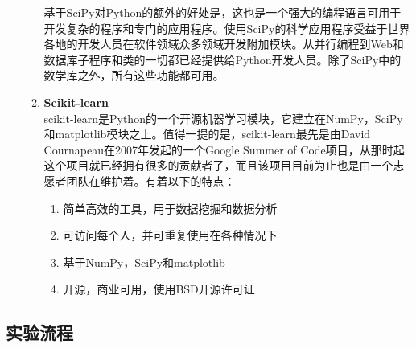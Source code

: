 \begin{enumerate}
\begin{enumerate}
        基于SciPy对Python的额外的好处是，这也是一个强大的编程语言可用于开发复杂的程序和专门的应用程序。使用SciPy的科学应用程序受益于世界各地的开发人员在软件领域众多领域开发附加模块。从并行编程到Web和数据库子程序和类的一切都已经提供给Python开发人员。除了SciPy中的数学库之外，所有这些功能都可用。
        \item \textbf{Scikit-learn} \\ scikit-learn是Python的一个开源机器学习模块，它建立在NumPy，SciPy和matplotlib模块之上。值得一提的是，scikit-learn最先是由David Cournapeau在2007年发起的一个Google Summer of Code项目，从那时起这个项目就已经拥有很多的贡献者了，而且该项目目前为止也是由一个志愿者团队在维护着。有着以下的特点：
        \begin{enumerate}
            \item 简单高效的工具，用于数据挖掘和数据分析
            \item 可访问每个人，并可重复使用在各种情况下
            \item 基于NumPy，SciPy和matplotlib
            \item 开源，商业可用，使用BSD开源许可证
        \end{enumerate}
    \end{enumerate}
\end{enumerate}

\subsection{实验流程}

